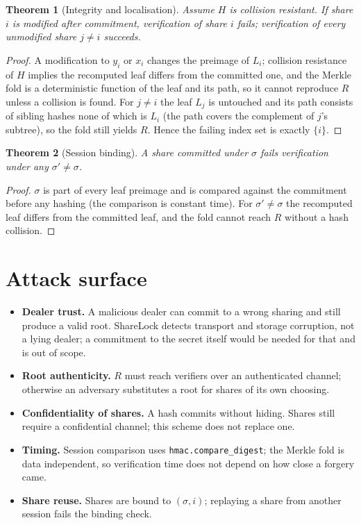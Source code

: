 \documentclass[11pt]{article}
\newtheorem{theorem}{Theorem}
\begin{document}
\begin{theorem}[Integrity and localisation]
Assume $H$ is collision resistant. If share $i$ is modified after commitment, verification of share
$i$ fails; verification of every unmodified share $j \ne i$ succeeds.
\end{theorem}
\begin{proof}
A modification to $y_i$ or $x_i$ changes the preimage of $L_i$; collision resistance of $H$ implies
the recomputed leaf differs from the committed one, and the Merkle fold is a deterministic function
of the leaf and its path, so it cannot reproduce $R$ unless a collision is found. For $j \ne i$ the
leaf $L_j$ is untouched and its path consists of sibling hashes none of which is $L_i$ (the path
covers the complement of $j$'s subtree), so the fold still yields $R$. Hence the failing index set
is exactly $\{i\}$.
\end{proof}

\begin{theorem}[Session binding]
A share committed under $\sigma$ fails verification under any $\sigma' \ne \sigma$.
\end{theorem}
\begin{proof}
$\sigma$ is part of every leaf preimage and is compared against the commitment before any hashing
(the comparison is constant time). For $\sigma' \ne \sigma$ the recomputed leaf differs from the
committed leaf, and the fold cannot reach $R$ without a hash collision.
\end{proof}

\section{Attack surface}
\begin{itemize}
  \item \textbf{Dealer trust.} A malicious dealer can commit to a wrong sharing and still produce a
  valid root. ShareLock detects transport and storage corruption, not a lying dealer; a
  commitment to the secret itself would be needed for that and is out of scope.
  \item \textbf{Root authenticity.} $R$ must reach verifiers over an authenticated channel;
  otherwise an adversary substitutes a root for shares of its own choosing.
  \item \textbf{Confidentiality of shares.} A hash commits without hiding. Shares still require a
  confidential channel; this scheme does not replace one.
  \item \textbf{Timing.} Session comparison uses \texttt{hmac.compare_digest}; the Merkle fold is
  data independent, so verification time does not depend on how close a forgery came.
  \item \textbf{Share reuse.} Shares are bound to $(\sigma, i)$; replaying a share from another
  session fails the binding check.
\end{itemize}
\end{document}

